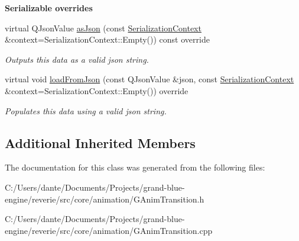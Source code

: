 \begin{Indent}\textbf{ Serializable overrides}\par
\begin{DoxyCompactItemize}
\item 
\mbox{\label{classrev_1_1_animation_transition_ac961a5f2101075d5da0d93ba3dfc3af7}} 
virtual Q\+Json\+Value \mbox{\hyperlink{classrev_1_1_animation_transition_ac961a5f2101075d5da0d93ba3dfc3af7}{as\+Json}} (const \mbox{\hyperlink{structrev_1_1_serialization_context}{Serialization\+Context}} \&context=Serialization\+Context\+::\+Empty()) const override
\begin{DoxyCompactList}\small\item\em Outputs this data as a valid json string. \end{DoxyCompactList}\item 
\mbox{\label{classrev_1_1_animation_transition_acda68f4adc65694c72b98cbc175256b1}} 
virtual void \mbox{\hyperlink{classrev_1_1_animation_transition_acda68f4adc65694c72b98cbc175256b1}{load\+From\+Json}} (const Q\+Json\+Value \&json, const \mbox{\hyperlink{structrev_1_1_serialization_context}{Serialization\+Context}} \&context=Serialization\+Context\+::\+Empty()) override
\begin{DoxyCompactList}\small\item\em Populates this data using a valid json string. \end{DoxyCompactList}\end{DoxyCompactItemize}
\end{Indent}
\subsection*{Additional Inherited Members}


The documentation for this class was generated from the following files\+:\begin{DoxyCompactItemize}
\item 
C\+:/\+Users/dante/\+Documents/\+Projects/grand-\/blue-\/engine/reverie/src/core/animation/G\+Anim\+Transition.\+h\item 
C\+:/\+Users/dante/\+Documents/\+Projects/grand-\/blue-\/engine/reverie/src/core/animation/G\+Anim\+Transition.\+cpp\end{DoxyCompactItemize}
